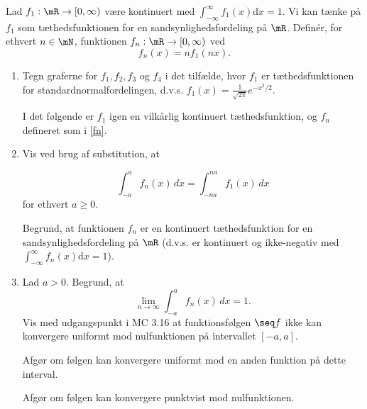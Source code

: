 \begin{opg}
Lad $f_1 : \mR \to [0, \infty)$ være kontinuert med $ \int_{- \infty}^{\infty} f_1(x) \mathrm{d} x = 1$. Vi kan tænke på $f_1$ som tæthedsfunktionen for en sandsynlighedsfordeling på $\mR$. Definér, for ethvert $n \in \mN$, funktionen $f_n : \mR \to [0, \infty)$ ved 
\begin{equation} \label{fn}
    f_n(x) = n f_1(nx).
\end{equation}

\begin{enumerate}
	\item Tegn graferne for $f_1, f_2, f_3$ og $f_4$ i det tilfælde, hvor $f_1$ er tæthedsfunktionen for standardnormalfordelingen, d.v.s. $f_1(x) = \frac{1}{\sqrt{2 \pi}} e^{-x^2/2}$. 
	
	I det følgende er $f_1$ igen en vilkårlig kontinuert tæthedsfunktion, og $f_n$ defineret som i \eqref{fn}.
	
	\item Vis ved brug af substitution, at 
	
	\begin{equation} \label{intid}
	\int_{-a}^a f_n(x) \,dx =  \int_{-na}^{na} f_1(x) \,dx 
	\end{equation}
	for ethvert $a \geq 0$.	
	
	Begrund, at funktionen $f_n$ er en kontinuert tæthedsfunktion for en sandsynlighedsfordeling på $\mR$ (d.v.s. er kontinuert og ikke-negativ med $\int_{-\infty}^{\infty} f_n(x) \mathrm{d}x=1$).
	
	\item Lad $a> 0$. Begrund, at 
	$$ \lim_{n \to \infty} \int_{-a}^a f_n(x) \,dx = 1. $$
    Vis med udgangspunkt i MC 3.16 at funktionsfølgen $\seq f$ ikke kan konvergere uniformt mod nulfunktionen på intervallet $[-a,a]$. 
	
	Afgør om følgen kan konvergere uniformt mod en anden funktion på dette interval.
	
	Afgør om følgen kan konvergere punktvist mod nulfunktionen.
\end{enumerate}
\end{opg}

